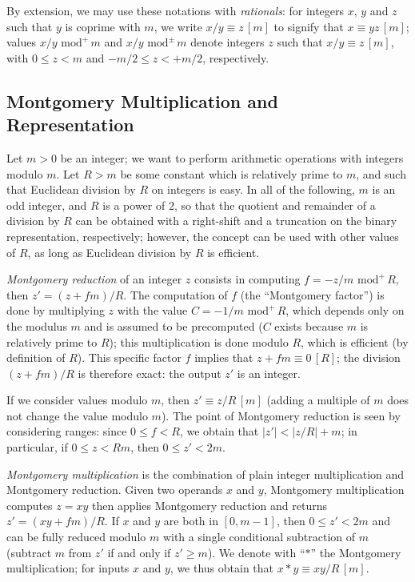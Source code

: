 \documentclass{llncs}
\newcommand{\eqvm}[3]{#1 \equiv #2 \,[#3]}
\newcommand{\umod}[2]{#1 \,\,\text{mod}^{+}\, #2}
\newcommand{\smod}[2]{#1 \,\,\text{mod}^{\pm}\, #2}
\begin{document}
By extension, we may use these notations with \emph{rationals}: for
integers $x$, $y$ and $z$ such that $y$ is coprime with $m$, we write
$\eqvm{x/y}{z}{m}$ to signify that $\eqvm{x}{yz}{m}$; values
$\umod{x/y}{m}$ and $\smod{x/y}{m}$ denote integers $z$ such that
$\eqvm{x/y}{z}{m}$, with $0 \leq z < m$ and $-m/2\leq z < +m/2$,
respectively.

\subsection{Montgomery Multiplication and Representation}%
\label{sec:montymul:repr}

Let $m > 0$ be an integer; we want to perform arithmetic operations with
integers modulo $m$. Let $R > m$ be some constant which is relatively
prime to $m$, and such that Euclidean division by $R$ on integers is
easy. In all of the following, $m$ is an odd integer, and $R$ is a power
of $2$, so that the quotient and remainder of a division by $R$ can be
obtained with a right-shift and a truncation on the binary
representation, respectively; however, the concept can be used with
other values of $R$, as long as Euclidean division by $R$ is efficient.

\emph{Montgomery reduction} of an integer $z$ consists in computing $f =
\umod{-z/m}{R}$, then $z' = (z + fm)/R$. The computation of $f$ (the
``Montgomery factor'') is done by multiplying $z$ with the value $C =
\umod{-1/m}{R}$, which depends only on the modulus $m$ and is assumed to
be precomputed ($C$ exists because $m$ is relatively prime to $R$); this
multiplication is done modulo $R$, which is efficient (by definition of
$R$). This specific factor $f$ implies that $\eqvm{z + fm}{0}{R}$; the
division $(z + fm)/R$ is therefore exact: the output $z'$ is an integer.

If we consider values modulo $m$, then $\eqvm{z'}{z/R}{m}$ (adding a
multiple of $m$ does not change the value modulo $m$). The point of
Montgomery reduction is seen by considering ranges: since $0\leq f < R$,
we obtain that $|z'| < |z/R| + m$; in particular, if $0\leq z < Rm$,
then $0\leq z' < 2m$.

\emph{Montgomery multiplication} is the combination of plain integer
multiplication and Montgomery reduction. Given two operands $x$ and $y$,
Montgomery multiplication computes $z = xy$ then applies Montgomery reduction
and returns $z' = (xy + fm)/R$. If $x$ and $y$ are both in $[0, m-1]$, then
$0\leq z' < 2m$ and can be fully reduced modulo $m$ with a single conditional
subtraction of $m$ (subtract $m$ from $z'$ if and only if $z' \geq m$).
We denote with ``$*$'' the Montgomery multiplication; for inputs $x$ and
$y$, we thus obtain that $\eqvm{x*y}{xy/R}{m}$.
\end{document}
